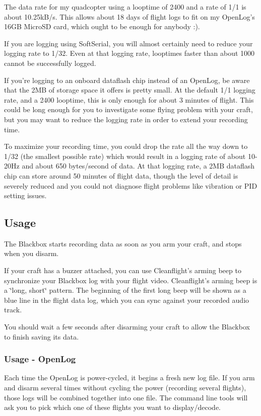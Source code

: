 The data rate for my quadcopter using a looptime of 2400 and a rate of 1/1 is about 10.\+25k\+B/s. This allows about 18 days of flight logs to fit on my Open\+Log's 16\+G\+B Micro\+S\+D card, which ought to be enough for anybody \+:).

If you are logging using Soft\+Serial, you will almost certainly need to reduce your logging rate to 1/32. Even at that logging rate, looptimes faster than about 1000 cannot be successfully logged.

If you're logging to an onboard dataflash chip instead of an Open\+Log, be aware that the 2\+M\+B of storage space it offers is pretty small. At the default 1/1 logging rate, and a 2400 looptime, this is only enough for about 3 minutes of flight. This could be long enough for you to investigate some flying problem with your craft, but you may want to reduce the logging rate in order to extend your recording time.

To maximize your recording time, you could drop the rate all the way down to 1/32 (the smallest possible rate) which would result in a logging rate of about 10-\/20\+Hz and about 650 bytes/second of data. At that logging rate, a 2\+M\+B dataflash chip can store around 50 minutes of flight data, though the level of detail is severely reduced and you could not diagnose flight problems like vibration or P\+I\+D setting issues.

\subsection*{Usage}

The Blackbox starts recording data as soon as you arm your craft, and stops when you disarm.

If your craft has a buzzer attached, you can use Cleanflight's arming beep to synchronize your Blackbox log with your flight video. Cleanflight's arming beep is a \char`\"{}long, short\char`\"{} pattern. The beginning of the first long beep will be shown as a blue line in the flight data log, which you can sync against your recorded audio track.

You should wait a few seconds after disarming your craft to allow the Blackbox to finish saving its data.

\subsubsection*{Usage -\/ Open\+Log}

Each time the Open\+Log is power-\/cycled, it begins a fresh new log file. If you arm and disarm several times without cycling the power (recording several flights), those logs will be combined together into one file. The command line tools will ask you to pick which one of these flights you want to display/decode.

